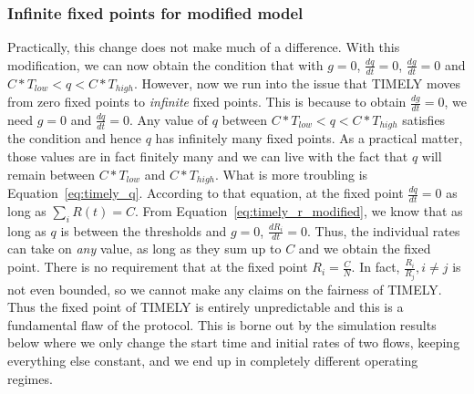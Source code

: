 \subsubsection{Infinite fixed points for modified model}
Practically, this change does not make much of a difference. With this modification, we can now obtain the condition that with $g =0$, $\tfrac{dq}{dt} = 0$, $\tfrac{dg}{dt} = 0$ and $C*T_{low} < q < C*T_{high}$. However, now we run into the issue that TIMELY moves from zero fixed points to \emph{infinite} fixed points. This is because to obtain $\tfrac{dg}{dt} =0$, we need $g = 0$ and $\tfrac{dq}{dt} = 0$. Any value of $q$ between $C*T_{low} < q < C*T_{high}$ satisfies the condition and hence $q$ has infinitely many fixed points. As a practical matter, those values are in fact finitely many and we can live with the fact that $q$ will remain between $C*T_{low}$ and $C*T_{high}$. What is more troubling is Equation~\ref{eq:timely_q}. According to that equation, at the fixed point $\tfrac{dq}{dt} = 0$ as long as $\sum_{i} R(t) =  C$. From Equation~\ref{eq:timely_r_modified}, we know that as long as $q$ is between the thresholds and $g=0$, $\tfrac{dR_i}{dt} = 0$. Thus, the individual rates can take on \emph{any} value, as long as they sum up to $C$ and we obtain the fixed point. There is no requirement that at the fixed point $R_i = \tfrac{C}{N}$. In fact, $\tfrac{R_{i}}{R_{j}}, i \ne j$ is not even bounded, so we cannot make any claims on the fairness of TIMELY. Thus the fixed point of TIMELY is entirely unpredictable and this is a fundamental flaw of the protocol. This is borne out by the simulation results below where we only change the start time and initial rates of two flows, keeping everything else constant, and we end up in completely different operating regimes.
